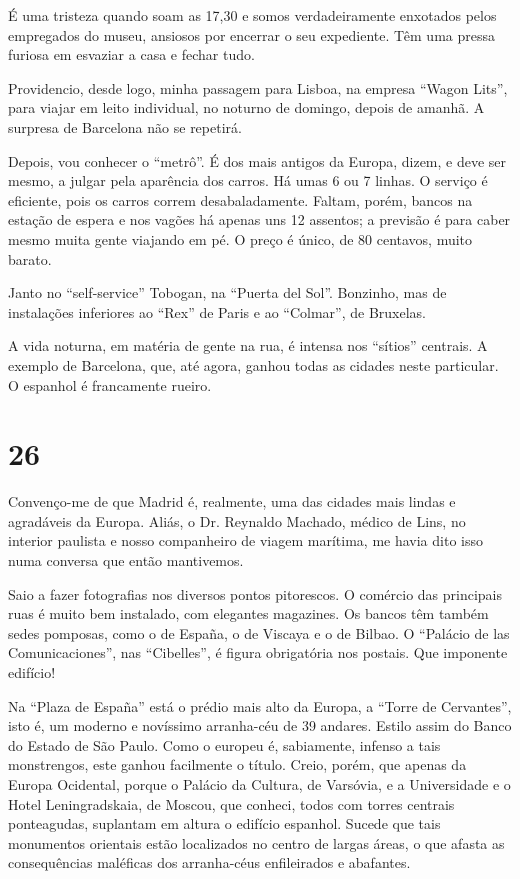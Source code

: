 É uma tristeza quando soam as 17,30 e somos verdadeiramente enxotados pelos empregados do museu, ansiosos por encerrar o seu expediente. Têm uma pressa furiosa em esvaziar a casa e fechar tudo.

Providencio, desde logo, minha passagem para Lisboa, na empresa ``Wagon Lits'', para viajar em leito individual, no noturno de domingo, depois de amanhã. A surpresa de Barcelona não se repetirá.

Depois, vou conhecer o ``metrô''. É dos mais antigos da Europa, dizem, e deve ser mesmo, a julgar pela aparência dos carros. Há umas 6 ou 7 linhas. O serviço é eficiente, pois os carros correm desabaladamente. Faltam, porém, bancos na estação de espera e nos vagões há apenas uns 12 assentos; a previsão é para caber mesmo muita gente viajando em pé. O preço é único, de 80 centavos, muito barato.

Janto no ``self-service'' Tobogan, na ``Puerta del Sol''. Bonzinho, mas de instalações inferiores ao ``Rex'' de Paris e ao ``Colmar'', de Bruxelas.

A vida noturna, em matéria de gente na rua, é intensa nos ``sítios'' centrais. A exemplo de Barcelona, que, até agora, ganhou todas as cidades neste particular. O espanhol é francamente rueiro.

\section*{26 \adfflatleafright {}}
Convenço-me de que Madrid é, realmente, uma das cidades mais lindas e agradáveis da Europa. Aliás, o Dr. Reynaldo Machado, médico de Lins, no interior paulista e nosso companheiro de viagem marítima, me havia dito isso numa conversa que então mantivemos.

Saio a fazer fotografias nos diversos pontos pitorescos. O comércio das principais ruas é muito bem instalado, com elegantes magazines. Os bancos têm também sedes pomposas, como o de España, o de Viscaya e o de Bilbao. O ``Palácio de las Comunicaciones'', nas ``Cibelles'', é figura obrigatória nos postais. Que imponente edifício!

Na ``Plaza de España'' está o prédio mais alto da Europa, a ``Torre de Cervantes'', isto é, um moderno e novíssimo arranha-céu de 39 andares. Estilo assim do Banco do Estado de São Paulo. Como o europeu é, sabiamente, infenso a tais monstrengos, este ganhou facilmente o título. Creio, porém, que apenas da Europa Ocidental, porque o Palácio da Cultura, de Varsóvia, e a Universidade e o Hotel Leningradskaia, de Moscou, que conheci, todos com torres centrais ponteagudas, suplantam em altura o edifício espanhol. Sucede que tais monumentos orientais estão localizados no centro de largas áreas, o que afasta as consequências maléficas dos arranha-céus enfileirados e abafantes.

